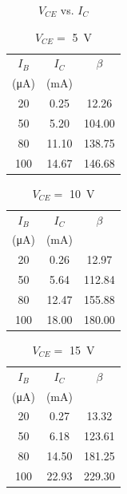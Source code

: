 \begin{figure}[hbtp]
  \centering
  \resizebox{1.0\textwidth}{!}{}
  \caption{\label{fig:graph} $V_{CE}$ vs. $I_C$}
\end{figure}

\begin{table}[hbtp]
  \centering
  \begin{tabular}{ccc}
    $I_B$                & $I_C$     & $\beta$ \\
    (\si{\micro\ampere}) & (\si{mA}) &         \\
    \hline
    20                   & 0.25      & 12.26   \\
    50                   & 5.20      & 104.00  \\
    80                   & 11.10     & 138.75  \\
    100                  & 14.67     & 146.68  \\
  \end{tabular}
  \caption{\label{tab:da2a1}$V_{CE} = $ \SI{5}{V}}
\end{table}

\begin{table}[hbtp]
  \centering
  \begin{tabular}{ccc}
    $I_B$                & $I_C$     & $\beta$ \\
    (\si{\micro\ampere}) & (\si{mA}) &         \\
    \hline
    20                   & 0.26      & 12.97   \\
    50                   & 5.64      & 112.84  \\
    80                   & 12.47     & 155.88  \\
    100                  & 18.00     & 180.00  \\
  \end{tabular}
  \caption{\label{tab:da2a2}$V_{CE} = $ \SI{10}{V}}
\end{table}

\begin{table}[hbtp]
  \centering
  \begin{tabular}{ccc}
    $I_B$                & $I_C$     & $\beta$ \\
    (\si{\micro\ampere}) & (\si{mA}) &         \\
    \hline
    20                   & 0.27      & 13.32   \\
    50                   & 6.18      & 123.61  \\
    80                   & 14.50     & 181.25  \\
    100                  & 22.93     & 229.30  \\
  \end{tabular}
  \caption{\label{tab:da2a3}$V_{CE} = $ \SI{15}{V}}
\end{table}

